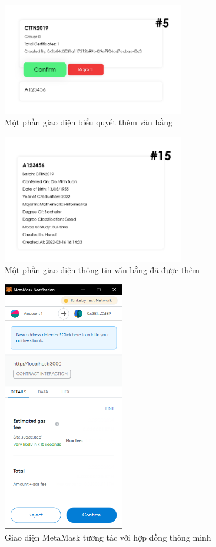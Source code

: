 \begin{figure}[!ht]
    \centering
    \includegraphics[width=300px]{images/app-confirm-cert.png}
    \caption{Một phần giao diện biểu quyết thêm văn bằng}
\end{figure}

\begin{figure}[!ht]
    \centering
    \includegraphics[width=300px]{images/app-cert-info.png}
    \caption{Một phần giao diện thông tin văn bằng đã được thêm}
\end{figure}

\begin{figure}[!ht]
    \centering
    \includegraphics[width=200px]{images/metamask-confirm-cert.png}
    \caption{Giao diện MetaMask tương tác với hợp đồng thông minh}
\end{figure}

